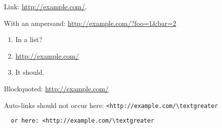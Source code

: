 Link: \url{http://example.com/}.

With an ampersand: \url{http://example.com/?foo=1&bar=2}
\begin{enumerate}
  \item{In a list?}
  \item{\url{http://example.com/}}
  \item{It should.}
\end{enumerate}
\begin{displayquote}
  
  Blockquoted: \url{http://example.com/}
\end{displayquote}

Auto-links should not occur here: \lstinline{<http://example.com/\textgreater}
\begin{verbatim}
  or here: <http://example.com/\textgreater
\end{verbatim}